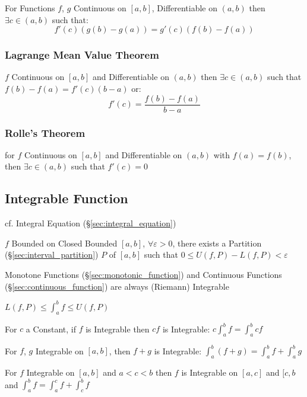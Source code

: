 For Functions $f$, $g$ Continuous on $[a,b]$, Differentiable on
$(a,b)$ then $\exists c \in (a,b)$ such that:
\[
  f'(c) (g(b) - g(a)) = g'(c) (f(b) - f(a))
\]



\subsubsection{Lagrange Mean Value Theorem}
\label{sec:lagrange_mean_value}

$f$ Continuous on $[a,b]$ and Differentiable on $(a,b)$ then $\exists
c \in (a,b)$ such that $f(b) - f(a) = f'(c)(b-a)$ or:
\[
  f'(c) = \frac{f(b) - f(a)}{b - a}
\]



\subsubsection{Rolle's Theorem}\label{sec:rolles_theorem}

for $f$ Continuous on $[a,b]$ and Differentiable on $(a,b)$ with $f(a)
= f(b)$, then $\exists c \in (a,b)$ such that $f'(c) = 0$



\subsection{Integrable Function}\label{sec:integrable_function}

cf. Integral Equation (\S\ref{sec:integral_equation})

$f$ Bounded on Closed Bounded $[a,b]$, $\forall \varepsilon >0$, there
exists a Partition (\S\ref{sec:interval_partition}) $P$ of $[a,b]$
such that $0 \leq U(f,P) - L(f,P) < \varepsilon$ %

Monotone Functions (\S\ref{sec:monotonic_function}) and Continuous
Functions (\S\ref{sec:continuous_function}) are always (Riemann)
Integrable

$L(f,P) \leq \int_a^b f \leq U(f,P)$

For $c$ a Constant, if $f$ is Integrable then $cf$ is Integrable: $c
\int_a^b f = \int_a^b c f$

For $f$, $g$ Integrable on $[a,b]$, then $f + g$ is Integrable:
$\int_a^b (f+g) = \int_a^b f + \int_a^b g$

For $f$ Integrable on $[a,b]$ and $a < c < b$ then $f$ is Integrable
on $[a,c]$ and $[c,b$ and $\int_a^b f = \int_a^c f + \int_c^b f$

